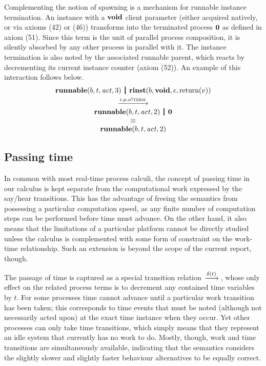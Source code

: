\documentclass[twocolumn]{article}
\begin{document}
Complementing the notion of spawning is a mechanism for runnable instance termination. An instance with a $\textbf{void}$ client parameter (either acquired natively, or via axioms (42) or (46)) transforms into the terminated process $\textbf{0}$ as defined in axiom (51). Since this term is the unit of parallel process composition, it is silently absorbed by any other process in parallel with it. The instance termination is also noted by the associated runnable parent, which reacts by decrementing its current instance counter (axiom (52)). An example of this interaction follows below.
$$
\begin{array}{c}
  {\Trunnable b t \Act 3} \Opar
  {\Trinst b \Tvoid \Teps {\Treturn v}} \vspace{0.6ex} \\
  \red{\say{i.p.o}{\Tterm}} \\
  {\Trunnable b t \Act 2} \Opar \Tzero \\
  \equiv \\
  {\Trunnable b t \Act 2}
\end{array}
$$


\subsection{Passing time}

In common with most real-time process calculi, the concept of passing time in our calculus is kept separate from the computational work expressed by the say/hear transitions. This has the advantage of freeing the semantics from possessing a particular computation speed, as any finite number of computation steps can be performed before time must advance. On the other hand, it also means that the  limitations of a particular platform cannot be directly studied unless the calculus is complemented with some form of constraint on the work-time relationship. Such an extension is beyond the scope of the current report, though.

The passage of time is captured as a special transition relation $\,\xrightarrow{\delta(t)}\,$, whose only effect on the related process terms is to decrement any contained time variables by $t$. For some processes time cannot advance until a particular work transition has been taken; this corresponds to time events that must be noted (although not necessarily acted upon) at the exact time instance when they occur. Yet other processes can only take time transitions, which simply means that they represent an idle system that currently has no work to do. Mostly, though, work and time transitions are simultaneously available, indicating that the semantics considers the slightly slower and slightly faster behaviour alternatives to be equally correct.
\end{document}

